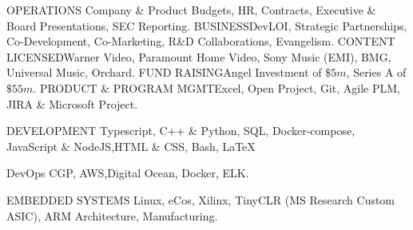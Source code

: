 
\begin{cvskills}
	\cvskill
   	{OPERATIONS}	{Company \& Product Budgets, HR, Contracts, Executive \& Board Presentations, SEC Reporting.}
    \cvskill
     {BUSINESS}{DevLOI, Strategic Partnerships, Co-Development, Co-Marketing, R\&D Collaborations, Evangelism.}
     \cvskill
     {CONTENT LICENSED}{Warner Video, Paramount Home Video, Sony Music (EMI), BMG, Universal Music, Orchard.}
      \cvskill
     {FUND RAISING}{Angel Investment of $\$5m$, Series A of $\$55m$.}
       \cvskill
     {PRODUCT \& PROGRAM MGMT}{Excel, Open Project, Git, Agile PLM, JIRA \& Microsoft Project.}
    
     \cvskill 
 {DEVELOPMENT} {Typescript, C++ \& Python, SQL, Docker-compose, JavaScript \& NodeJS,HTML \& CSS, Bash, LaTeX}
  
  \cvskill
{DevOps} {CGP, AWS,Digital Ocean, Docker, ELK.}

 \cvskill
{EMBEDDED SYSTEMS} {Linux, eCos, Xilinx, TinyCLR (MS Research Custom ASIC), ARM Architecture, Manufacturing.}
    \vspace{-8mm}
\end{cvskills}

